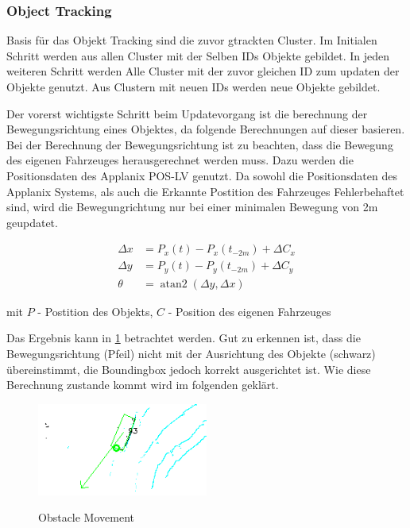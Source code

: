 \documentclass[11pt,oneside,openright]{mpreport}
\DeclareMathOperator{\atantwo}{atan2}
\begin{document}
\subsubsection{Object Tracking}
Basis für das Objekt Tracking sind die zuvor gtrackten Cluster. Im Initialen Schritt werden aus allen Cluster mit der Selben IDs Objekte gebildet.
In jeden weiteren Schritt werden Alle Cluster mit der zuvor gleichen ID zum updaten der Objekte genutzt. Aus Clustern mit neuen IDs werden neue Objekte gebildet.

Der vorerst wichtigste Schritt beim Updatevorgang ist die berechnung der Bewegungsrichtung eines Objektes, da folgende Berechnungen auf dieser basieren.
Bei der Berechnung der Bewegungsrichtung ist zu beachten, dass die Bewegung des eigenen Fahrzeuges herausgerechnet werden muss.
Dazu werden die Positionsdaten des Applanix POS-LV genutzt. Da sowohl die Positionsdaten des Applanix Systems, als auch die Erkannte Postition des Fahrzeuges Fehlerbehaftet sind,
wird die Bewegungrichtung nur bei einer minimalen Bewegung von 2m geupdatet.

\begin{align*}
\Delta x &= P_x(t) - P_x(t_{-2m}) + \Delta C_x\\
\Delta y &= P_y(t) - P_y(t_{-2m}) + \Delta C_y\\
\theta &= \atantwo(\Delta y,\Delta x)
\end{align*}

mit $P$ - Postition des Objekts, $C$ - Position des eigenen Fahrzeuges

Das Ergebnis kann in \cref{obst_rot} betrachtet werden. Gut zu erkennen ist, dass die Bewegungsrichtung (Pfeil) nicht mit der Ausrichtung des Objekte (schwarz) übereinstimmt,
die Boundingbox jedoch korrekt ausgerichtet ist. Wie diese Berechnung zustande kommt wird im folgenden geklärt.

\begin{figure}[!ht]
\caption{Obstacle Movement}
\includegraphics[width=0.5\textwidth]{bilder/obst_rot.png}
\label{obst_rot}
\end{figure}
\end{document}
